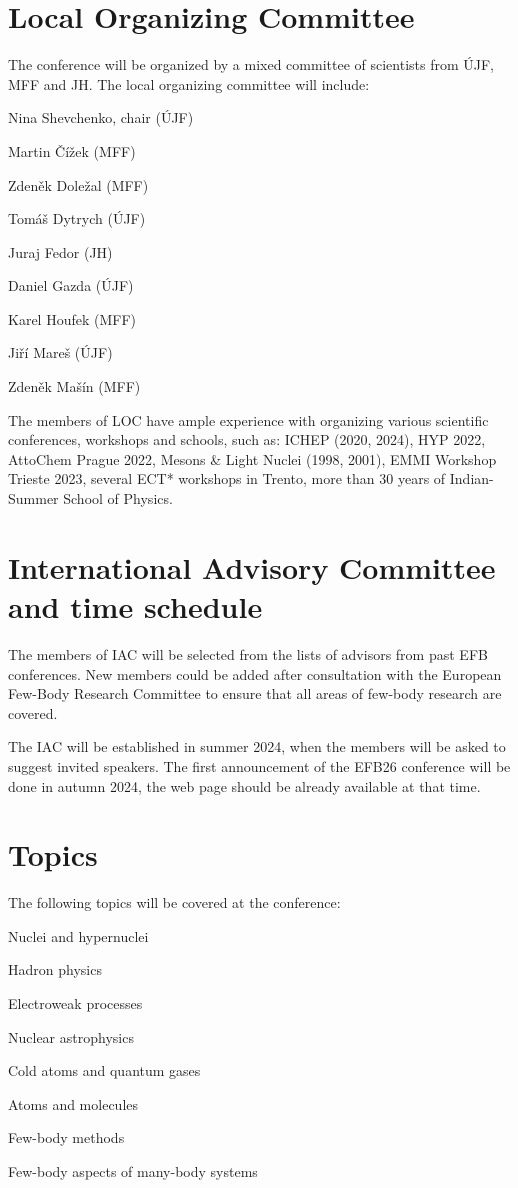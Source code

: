 \documentclass[12pt]{extarticle}
\newcommand*\sq{\mathbin{\vcenter{\hbox{\rule{.8ex}{.8ex}}}}}
\newenvironment{t_sq_itemize}
{\begin{itemize}[topsep=0pt, parsep=0pt, itemsep=0pt, leftmargin=*]
    \renewcommand{\labelitemi}{{\(\sq\)}}}
  {\end{itemize}}
\begin{document}
\section*{Local Organizing Committee}
\noindent
%
The conference will be organized by a mixed committee of scientists
from ÚJF, MFF and JH.
The local organizing committee will include:
\begin{t_sq_itemize}
  \def\ujf{ÚJF}%
  \def\jh{JH}%
  \def\mff{MFF}%
\item Nina Shevchenko, chair (\ujf)
\item Martin Čížek (\mff)
\item Zdeněk Doležal (\mff)
\item Tomáš Dytrych (\ujf)
\item Juraj Fedor (\jh)
\item Daniel Gazda (\ujf)
\item Karel Houfek (\mff)
\item Jiří Mareš (\ujf)
\item Zdeněk Mašín (\mff)
\end{t_sq_itemize}
The members of LOC have ample experience with organizing various
scientific conferences, workshops and schools, such as: ICHEP (2020,
2024), HYP 2022, AttoChem Prague 2022, Mesons \& Light Nuclei (1998,
2001), EMMI Workshop Trieste 2023, several ECT* workshops in Trento,
more than 30 years of Indian-Summer School of Physics.

\section*{International Advisory Committee and time schedule}
\noindent
The members of IAC will be selected from the lists of advisors from
past EFB conferences. New members could be added after consultation
with the European Few-Body Research Committee to ensure that all areas
of few-body research are covered.

The IAC will be established in summer 2024, when the members will be
asked to suggest invited speakers. The first announcement of the EFB26
conference will be done in autumn 2024, the web page should be already
available at that time.

\section*{Topics}
\noindent
The following topics will be covered at the conference:
\begin{t_sq_itemize}
\item Nuclei and hypernuclei
\item Hadron physics
\item Electroweak processes
\item Nuclear astrophysics
\item Cold atoms and quantum gases
\item Atoms and molecules
\item Few-body methods
\item Few-body aspects of many-body systems
\end{t_sq_itemize}
\end{document}
